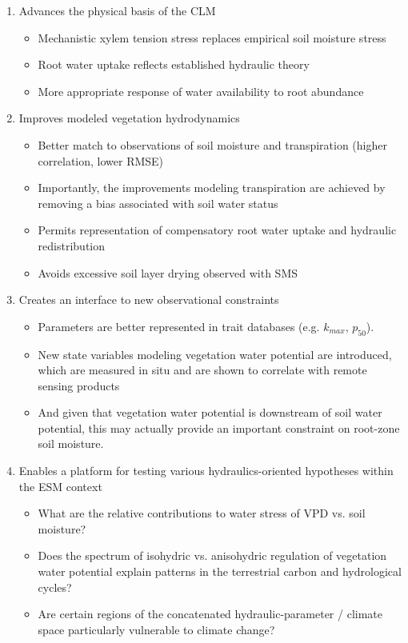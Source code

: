 \documentclass[draft,linenumbers]{agujournal}
\begin{document}
\begin{enumerate}
    \item Advances the physical basis of the CLM
        \begin{itemize}
        \item Mechanistic xylem tension stress replaces empirical soil moisture stress
        \item Root water uptake reflects established hydraulic theory
        \item More appropriate response of water availability to root abundance 
        \end{itemize}
    \item Improves modeled vegetation hydrodynamics
    	\begin{itemize}
	\item Better match to observations of soil moisture and transpiration (higher correlation, lower RMSE)
	\item Importantly, the improvements modeling transpiration are achieved by removing a bias associated with soil water status
	\item Permits representation of compensatory root water uptake and hydraulic redistribution
	\item Avoids excessive soil layer drying observed with SMS
	\end{itemize}
    \item Creates an interface to new observational constraints
        \begin{itemize}
        \item Parameters are better represented in trait databases (e.g. $k_{max}$, $p_{50}$).
        \item New state variables modeling vegetation water potential are introduced, which are measured in situ and are shown to correlate with remote sensing products
        \item And given that vegetation water potential is downstream of soil water potential, this may actually provide an important constraint on root-zone soil moisture.
        \end{itemize}
    \item Enables a platform for testing various hydraulics-oriented hypotheses within the ESM context
    \begin{itemize}
        \item What are the relative contributions to water stress of VPD vs. soil moisture?
        \item Does the spectrum of isohydric vs. anisohydric regulation of vegetation water potential explain patterns in the terrestrial carbon and hydrological cycles?
        \item Are certain regions of the concatenated hydraulic-parameter / climate space particularly vulnerable to climate change?
    \end{itemize}
\end{enumerate}
\end{document}
